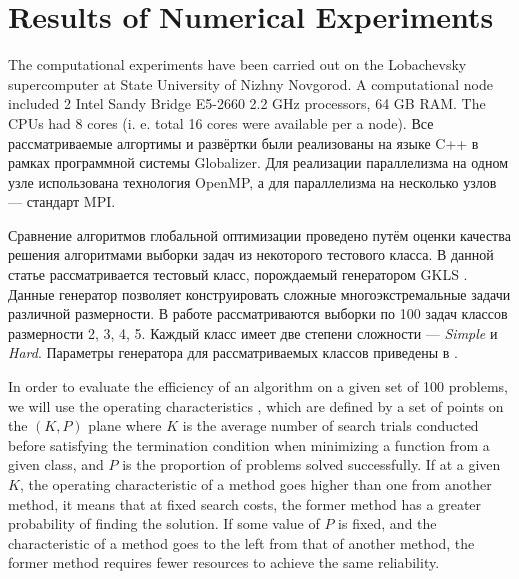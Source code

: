 \documentclass[runningheads]{llncs}
\begin{document}
\section{Results of Numerical Experiments}
\begin{Russian}

The computational experiments have been carried out on the Lobachevsky supercomputer at
State University of Nizhny Novgorod. A computational node included 2 Intel
Sandy Bridge E5-2660 2.2 GHz processors, 64 GB RAM. The CPUs had 8 cores (i. e. total 16 cores
were available per a node). Все рассматриваемые алгортимы и развёртки были реализованы на языке C++ в рамках программной системы Globalizer\cite{globalizerSystem}.
Для реализации параллелизма на одном узле использована технология OpenMP, а для параллелизма на несколько узлов --- стандарт MPI.

Сравнение алгоритмов глобальной оптимизации проведено путём оценки качества решения алгоритмами выборки задач из некоторого тестового класса.
В данной статье рассматривается тестовый класс, порождаемый генератором GKLS \cite{Gaviano2003}. Данные генератор позволяет конструировать сложные многоэкстремальные задачи различной размерности. В работе рассматриваются выборки по 100 задач классов размерности 2, 3, 4, 5. Каждый класс имеет две степени сложности --- \textit{Simple} и \textit{Hard}. Параметры генератора для рассматриваемых классов приведены в \cite{Gaviano2003}.

\end{Russian}

In order to evaluate the efficiency of an algorithm on a given set of 100 problems, we will use the
operating characteristics \cite{grishaginClass}, which are defined by a set of
points on the \((K, P)\) plane where \(K\) is the average number of search trials
conducted before satisfying the termination condition when minimizing a function
from a given class, and \(P\) is the proportion of problems solved successfully.
If at a given \(K\), the operating characteristic of a method goes higher than one
from another method, it means that at fixed search costs, the former method has a
greater probability of finding the solution. If some value of \(P\) is fixed, and the
characteristic of a method goes to the left from that of another method, the former
method requires fewer resources to achieve the same reliability.

\end{document}
